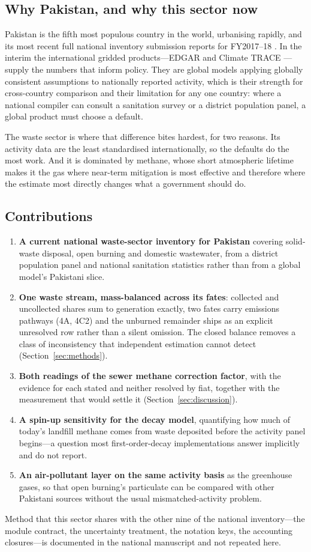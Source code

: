 \subsection{Why Pakistan, and why this sector now}

Pakistan is the fifth most populous country in the world, urbanising rapidly, and its most
recent full national inventory submission reports for FY2017--18 \citep{pakbur1}. In the
interim the international gridded products---EDGAR \citep{edgar2025booklet,crippa2020} and Climate
TRACE \citep{climatetrace}---supply the numbers that inform policy. They are global models
applying globally consistent assumptions to nationally reported activity, which is their
strength for cross-country comparison and their limitation for any one country: where a
national compiler can consult a sanitation survey or a district population panel, a global
product must choose a default.

The waste sector is where that difference bites hardest, for two reasons. Its activity data
are the least standardised internationally, so the defaults do the most work. And it is
dominated by methane, whose short atmospheric lifetime makes it the gas where near-term
mitigation is most effective and therefore where the estimate most directly changes what a
government should do.

\subsection{Contributions}

\begin{enumerate}[leftmargin=*,itemsep=2pt,topsep=3pt]
\item \textbf{A current national waste-sector inventory for Pakistan} covering solid-waste
  disposal, open burning and domestic wastewater, from a district population panel and
  national sanitation statistics rather than from a global model's Pakistani slice.
\item \textbf{One waste stream, mass-balanced across its fates}: collected and uncollected
  shares sum to generation exactly, two fates carry emissions pathways (4A, 4C2) and the
  unburned remainder ships as an explicit unresolved row rather than a silent omission. The
  closed balance removes a class of inconsistency that independent estimation cannot
  detect (Section~\ref{sec:methods}).
\item \textbf{Both readings of the sewer methane correction factor}, with the evidence for
  each stated and neither resolved by fiat, together with the measurement that would settle
  it (Section~\ref{sec:discussion}).
\item \textbf{A spin-up sensitivity for the decay model}, quantifying how much of today's
  landfill methane comes from waste deposited before the activity panel begins---a question
  most first-order-decay implementations answer implicitly and do not report.
\item \textbf{An air-pollutant layer on the same activity basis} as the greenhouse gases, so
  that open burning's particulate can be compared with other Pakistani sources without the
  usual mismatched-activity problem.
\end{enumerate}

Method that this sector shares with the other nine of the national inventory---the module
contract, the uncertainty treatment, the notation keys, the accounting closures---is
documented in the national manuscript \citep{ahmad2026national} and not repeated here.
